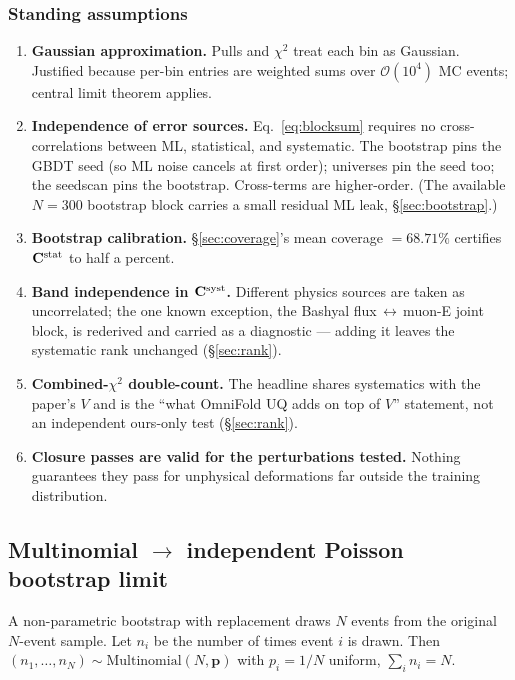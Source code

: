 \subsubsection*{Standing assumptions}

\begin{enumerate}[nosep]
  \item \textbf{Gaussian approximation.} Pulls and $\chi^{2}$ treat
        each bin as Gaussian. Justified because per-bin entries are
        weighted sums over $\mathcal{O}(10^{4})$ MC events; central
        limit theorem applies.
  \item \textbf{Independence of error sources.}
        Eq.~\eqref{eq:blocksum} requires no cross-correlations between
        ML, statistical, and systematic. The bootstrap pins the GBDT
        seed (so ML noise cancels at first order); universes pin the
        seed too; the seedscan pins the bootstrap. Cross-terms are
        higher-order. (The available $N=300$ bootstrap block carries a
        small residual ML leak, \S\ref{sec:bootstrap}.)
  \item \textbf{Bootstrap calibration.} \S\ref{sec:coverage}'s mean
        coverage $= 68.71\%$ certifies $\mathbf{C}^{\text{stat}}$ to half a
        percent.
  \item \textbf{Band independence in $\mathbf{C}^{\text{syst}}$.}
        Different physics sources are taken as uncorrelated; the one
        known exception, the Bashyal flux\,$\leftrightarrow$\,muon-E
        joint block, is rederived and carried as a diagnostic --- adding
        it leaves the systematic rank unchanged (\S\ref{sec:rank}).
  \item \textbf{Combined-$\chi^{2}$ double-count.} The headline shares
        systematics with the paper's $V$ and is the ``what OmniFold UQ
        adds on top of $V$'' statement, not an independent ours-only
        test (\S\ref{sec:rank}).
  \item \textbf{Closure passes are valid for the perturbations
        tested.} Nothing guarantees they pass for unphysical
        deformations far outside the training distribution.
\end{enumerate}


\subsection{Multinomial $\to$ independent Poisson bootstrap limit}
\label{app:poisson}

A non-parametric bootstrap with replacement draws $N$ events from the
original $N$-event sample. Let $n_{i}$ be the number of times event
$i$ is drawn. Then $(n_{1},\dots,n_{N}) \sim \mathrm{Multinomial}(N,
\mathbf{p})$ with $p_{i}=1/N$ uniform, $\sum_{i}n_{i}=N$.

